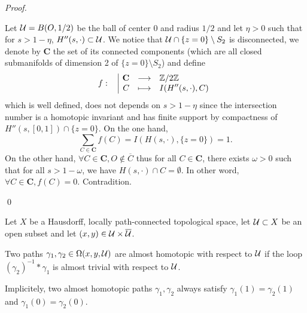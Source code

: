 \begin{proof}
\begin{itemize}
Let $\mathcal{U}=B(O,1/2)$ be the ball of center $0$ and radius $1/2$ and let $\eta>0$ such that for $s>1-\eta$, $H''(s,\cdot)\subset \mathcal{U}$. We notice that $\mathcal{U}\cap \{z=0\}\setminus S_2$ is disconnected, we denote by $\mathbf{C}$ the set of its connected components (which are all closed submanifolds of dimension 2 of $\{z=0\}\setminus S_2$) and define 
$$\displaystyle f:\begin{array}{l|rcl} & \displaystyle \mathbf{C} & \longrightarrow & \displaystyle \mathbb{Z}/2\mathbb{Z} \\ & \displaystyle C & \longmapsto & \displaystyle I(H''(s,\cdot),C) \end{array}$$
 which is well defined, does not depends on $s>1-\eta$ since the intersection number is a homotopic invariant and has finite support by compactness of $H''(s,[0,1])\cap \{z=0\}$. On the one hand, $$\sum_{C\in \mathbf{C}} f(C) = I(H(s,\cdot),\{z=0\})=1.$$
 On the other hand,  
 $\forall C\in \mathbf{C}, O \notin \overline C$ thus for all $C\in {\mathbf{C}}$, there exists $\omega>0$ such that for all $s>1-\omega$, we have $H(s,\cdot)\cap C = \emptyset$. In other word, $\forall C\in \mathbf{C}, f(C)=0$. Contradition. 


 
 
   
 \end{itemize}
\qed\end{proof}

\begin{defi}
 Let $X$ be a Hausdorff, locally path-connected topological space, let $\mathcal{U}\subset X$ be an open subset and let $(x,y)\in \mathcal{U}\times \overline {\mathcal{U}}$.

Two paths $\gamma_1,\gamma_2 \in \Omega(x,y,\mathcal{U})$ are almost homotopic with respect to $\mathcal{U}$ if the loop $(\gamma_2)^{-1}*\gamma_1$ is almost trivial with respect to $\mathcal{U}$.
\end{defi}

\begin{rem} Implicitely, two almost homotopic paths $\gamma_1,\gamma_2$ always satisfy $\gamma_1(1)=\gamma_2(1)$ and $\gamma_1(0)=\gamma_2(0)$. 
\end{rem}

